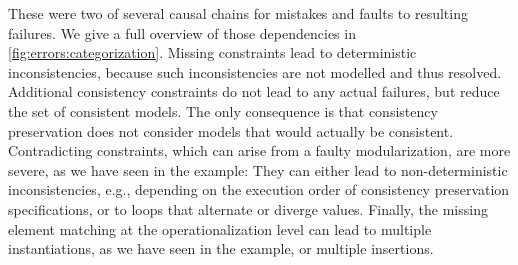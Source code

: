 These were two of several causal chains for mistakes and faults to resulting failures.
We give a full overview of those dependencies in \autoref{fig:errors:categorization}.
Missing constraints lead to deterministic inconsistencies, because such inconsistencies are not modelled and thus resolved.
Additional consistency constraints do not lead to any actual failures, but reduce the set of consistent models. 
The only consequence is that consistency preservation does not consider models that would actually be consistent.
Contradicting constraints, which can arise from a faulty modularization, are more severe, as we have seen in the example:
They can either lead to non-deterministic inconsistencies, e.g., depending on the execution order of consistency preservation specifications, or to loops that alternate or diverge values.
Finally, the missing element matching at the operationalization level can lead to multiple instantiations, as we have seen in the example, or multiple insertions. %


